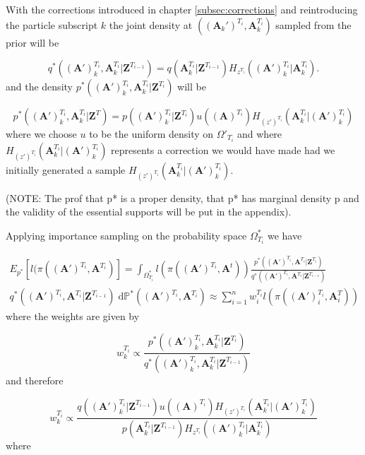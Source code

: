 \documentclass{article}
\newcommand{\D}{\mathrm{d}}
\renewcommand{\vec}[1]{\mathbf{#1}}
\begin{document}
With the corrections introduced in chapter \ref{subsec:corrections} and reintroducing the particle subscript $k$ the joint density at $((\vec{A}_k')^{T_i}, \vec{A}_k^{T_i})$ sampled from the prior will be

\begin{equation*}
    q^*(\vec{(A')}^{T_i}_k, \vec{A}^{T_i}_k | \vec{Z}^{T_{i-1}}) = q(\vec{A}^{T_i}_k | \vec{Z}^{T_{i-1}}) H_{z^{T_i}} (\vec{(A')}^{T_i}_k | \vec{A}^{{T_i}}_k).
\end{equation*}
and the density $p^*(\vec{(A')}^{T_i}_k, \vec{A}^{T_i}_k | \vec{Z}^{T_i})$ will be

\begin{equation*}
    p^*(\vec{(A')}^{T_i}_k, \vec{A}^{T_i}_k | \vec{Z}^{T}) = p(\vec{(A')}^{T_i}_k | \vec{Z}^{T_i}) u(\vec{(A)}^{T_i}) H_{(z')^{T_i}} (\vec{A}^{T_i}_k | \vec{(A')}^{{T_i}}_k)
\end{equation*}
where we choose $u$ to be the uniform density on $\Omega'_{T_i}$ and where $H_{(z')^{T_i}} (\vec{A}^{T_i}_k | \vec{(A')}^{{T_i}}_k)$ represents a correction we would have made had we initially generated a sample $H_{(z')^{T_i}} (\vec{A}^{T_i}_k | \vec{(A')}^{{T_i}}_k)$.

(NOTE: The prof that p* is a proper density, that p* has marginal density p and the validity of the essential supports will be put in the appendix).

Applying importance sampling on the probability space $\Omega^*_{T_i}$ we have

\begin{align*}
    E_{p^*}[l(\pi (\vec{(A')}^{T_i}, \vec{A}^{T_i})] = \int_{\Omega^*_{T_i}} l(\pi((\vec{A}')^{T_i}, \vec{A}^{t})) \frac{p^*(\vec{(A')}^{T_i}, \vec{A}^{T_i}|\vec{Z}^{T_i})} {q^*(\vec{(A')}^{T_i}, \vec{A}^{T_i} | \vec{Z}^{T_{i-1}})}  \\
    q^*(\vec{(A')}^{T_i}, \vec{A}^{T_i} | \vec{Z}^{T_{i-1}}) \; \D \mathbb{P}^*((\vec{A}')^{T_i}, \vec{A}^{T_i}) \approx \sum_{i=1}^n  w^{T_i}_i l(\pi (\vec{(A')}^{T_i}_i, \vec{A}^{T}_i))
\end{align*}
where the weights are given by

\begin{equation*}
    w^{T_i}_k \propto \frac{p^*(\vec{(A')}^{T_i}_k, \vec{A}^{T_i}_k | \vec{Z}^{T_i})} {q^*(\vec{(A')}^{T_i}_k, \vec{A}^{T_i}_k | \vec{Z}^{T_{i-1}})}
\end{equation*}
and therefore

\begin{equation*}
    w^{T_i}_k \propto \frac{q(\vec{(A')}^{T_i}_k | \vec{Z}^{T_{i-1}}) u(\vec{(A)}^{T_i}) H_{(z')^{T_i}} (\vec{A}^{T_i}_k | \vec{(A')}^{T_i}_k)}{p(\vec{A}^{T_i}_k | \vec{Z}^{T_{i-1}}) H_{z^{T_i}} (\vec{(A')}^{T_i}_k | \vec{A}^{T_i}_k)}
\end{equation*}
where 
\end{document}
